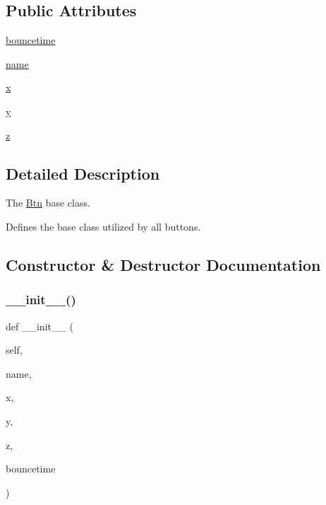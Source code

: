 \subsection*{Public Attributes}
\begin{DoxyCompactItemize}
\item 
\hyperlink{classRET__config_1_1Btn_a4b8980abcbbe29171f010fbaf958e5aa}{bouncetime}
\item 
\hyperlink{classRET__config_1_1Btn_ab74e6bf80237ddc4109968cedc58c151}{name}
\item 
\hyperlink{classRET__config_1_1Btn_a9336ebf25087d91c818ee6e9ec29f8c1}{x}
\item 
\hyperlink{classRET__config_1_1Btn_a2fb1c5cf58867b5bbc9a1b145a86f3a0}{y}
\item 
\hyperlink{classRET__config_1_1Btn_a25ed1bcb423b0b7200f485fc5ff71c8e}{z}
\end{DoxyCompactItemize}


\subsection{Detailed Description}
The \hyperlink{classRET__config_1_1Btn}{Btn} base class. 

Defines the base class utilized by all buttons. 

\subsection{Constructor \& Destructor Documentation}
\mbox{\label{classRET__config_1_1Btn_aa725bfbd448cdd640b165bb91322b69b}} 
\subsubsection{\texorpdfstring{\+\_\+\+\_\+init\+\_\+\+\_\+()}{\_\_init\_\_()}}
{\footnotesize\ttfamily def \+\_\+\+\_\+init\+\_\+\+\_\+ (\begin{DoxyParamCaption}\item[{}]{self,  }\item[{}]{name,  }\item[{}]{x,  }\item[{}]{y,  }\item[{}]{z,  }\item[{}]{bouncetime }\end{DoxyParamCaption})}



